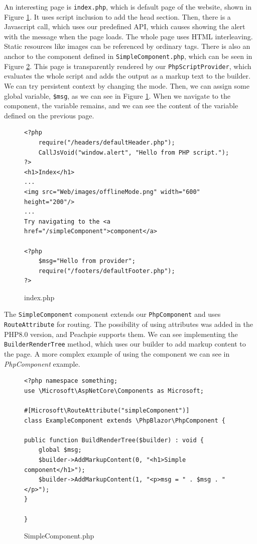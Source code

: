 \par
An interesting page is \texttt{index.php}, which is default page of the website, shown in Figure \ref{img23:index}.
It uses script inclusion to add the head section.
Then, there is a Javascript call, which uses our predefined API, which causes showing the alert with the message when the page loads.
The whole page uses HTML interleaving.
Static resources like images can be referenced by ordinary tags.
There is also an anchor to the component defined in \texttt{SimpleComponent.php}, which can be seen in Figure \ref{img24:component}.
This page is transparently rendered by our \texttt{PhpScriptProvider}, which evaluates the whole script and adds the output as a markup text to the builder.
We can try persistent context by changing the mode.
Then, we can assign some global variable, \texttt{\$msg}, as we can see in Figure \ref{img23:index}.
When we navigate to the component, the variable remains, and we can see the content of the variable defined on the previous page.
\par
\begin{figure}[H]
\begin{lstlisting}
<?php
    require("/headers/defaultHeader.php");
    CallJsVoid("window.alert", "Hello from PHP script.");
?>
<h1>Index</h1>
...
<img src="Web/images/offlineMode.png" width="600" height="200"/>
...
Try navigating to the <a href="/simpleComponent">component</a>

<?php
    $msg="Hello from provider";
    require("/footers/defaultFooter.php");
?>
\end{lstlisting}
\caption{index.php}
\label{img23:index}
\end{figure}
\par
The \texttt{SimpleComponent} component extends our \texttt{PhpComponent} and uses \texttt{RouteAttribute} for routing.
The possibility of using attributes was added in the PHP8.0 version, and Peachpie supports them.
We can see implementing the \texttt{BuilderRenderTree} method, which uses our builder to add markup content to the page.
A more complex example of using the component we can see in \textit{PhpComponent} example.
\par
\begin{figure}
\begin{lstlisting}
<?php namespace something;
use \Microsoft\AspNetCore\Components as Microsoft;

#[Microsoft\RouteAttribute("simpleComponent")]
class ExampleComponent extends \PhpBlazor\PhpComponent {	

public function BuildRenderTree($builder) : void {
	global $msg;
	$builder->AddMarkupContent(0, "<h1>Simple component</h1>");
	$builder->AddMarkupContent(1, "<p>msg = " . $msg . "</p>");
}

}
\end{lstlisting}
\caption{SimpleComponent.php}
\label{img24:component}
\end{figure}
